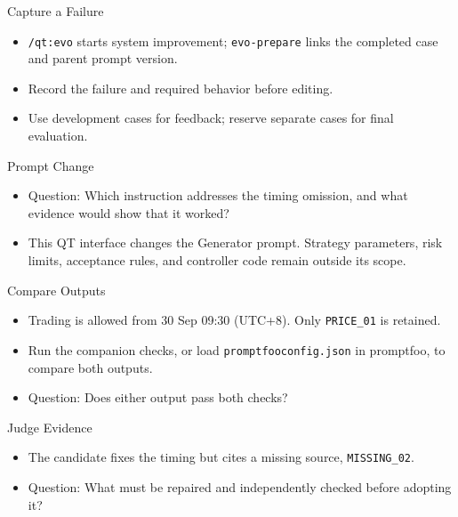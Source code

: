 \begin{frame}{Capture a Failure}

\medskip
\begin{itemize}
\item \texttt{/qt:evo} starts system improvement; \texttt{evo-prepare} links the completed case and parent prompt version.
\item Record the failure and required behavior before editing.
\item Use development cases for feedback; reserve separate cases for final evaluation.
\end{itemize}
\end{frame}

\begin{frame}{Prompt Change\handsup}
\begin{center}

\end{center}
\begin{itemize}
\item Question: Which instruction addresses the timing omission, and what evidence would show that it worked?
\item This QT interface changes the Generator prompt. Strategy parameters, risk limits, acceptance rules, and controller code remain outside its scope.
\end{itemize}
\end{frame}

\begin{frame}{Compare Outputs\handsup}
\begin{center}
\small
\end{center}
\begin{itemize}
\item Trading is allowed from 30 Sep 09:30 (UTC+8). Only \texttt{PRICE\_01} is retained.
\item Run the companion checks, or load \texttt{promptfooconfig.json} in promptfoo, to compare both outputs.
\item Question: Does either output pass both checks?
\end{itemize}
\end{frame}

\begin{frame}{Judge Evidence\handsup}
\begin{center}
\small
\end{center}
\begin{itemize}
\item The candidate fixes the timing but cites a missing source, \texttt{MISSING\_02}.
\item Question: What must be repaired and independently checked before adopting it?
\end{itemize}
\end{frame}

